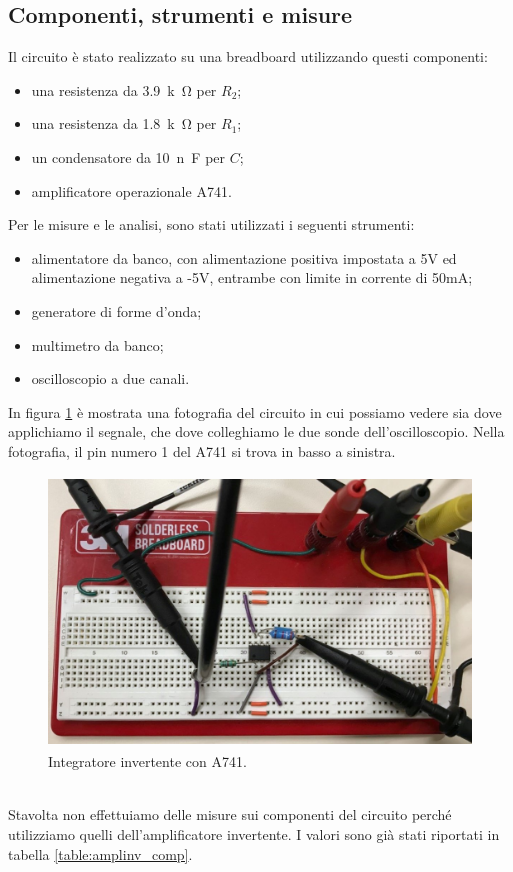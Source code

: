 \documentclass{report}
\begin{document}
\subsection{Componenti, strumenti e misure} 
Il circuito è stato realizzato su una breadboard utilizzando questi componenti:
\begin{itemize}
\item una resistenza da \SI{3.9}{k\ohm} per $R_2$;
\item una resistenza da \SI{1.8}{k\ohm} per $R_1$;
\item un condensatore da \SI{10}{n\farad} per $C$;
\item amplificatore operazionale \textmu A741.
\end{itemize}
Per le misure e le analisi, sono stati utilizzati i seguenti strumenti:
\begin{itemize}
\item alimentatore da banco, con alimentazione positiva impostata a 5V ed alimentazione negativa a -5V, entrambe con limite in corrente di 50mA;
\item generatore di forme d'onda;
\item multimetro da banco;
\item oscilloscopio a due canali.
\end{itemize}
In figura \ref{figura:foto_int} è mostrata una fotografia del circuito in cui possiamo vedere sia dove applichiamo il segnale, che dove colleghiamo le due sonde dell'oscilloscopio. Nella fotografia, il pin numero 1 del \textmu A741 si trova in basso a sinistra.
\begin{figure}[h]
\centering
\includegraphics[height=7.2cm]{immagini/foto_int}
\caption{Integratore invertente con \textmu A741.}
\label{figura:foto_int}
\end{figure}
\\Stavolta non effettuiamo delle misure sui componenti del circuito perché utilizziamo quelli dell'amplificatore invertente. I valori sono già stati riportati in tabella \ref{table:amplinv_comp}.
\end{document}
